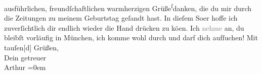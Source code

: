 \begin{ledgroupsized}[t]{13cm}
               ausführlichen, freundſchaftlichen warmherzigen Grüße\substVorne{}\textsuperscript{ſ}\substDazwischen{}d\substHinten{}anken, die du mir durch die Zeitungen zu meinem Geburtstag geſandt hast. In
               dieſem So{\geminationm}er hoffe ich zuverſichtlich dir
               endlich wieder die Hand drücken zu kö{\geminationn}en. Ich
                  \textcolor{gray}{nehme} an, du bleibſt vorläufig in München, {\pb}ich komme wohl durch
               und darf dich aufſuchen!\pend
           \pstart
           Mit tauſen{[}d{]} Grüßen,{\\[\baselineskip]}Dein getreuer{\\[\baselineskip]}\spacefill\mbox{Arthur}\pend
           \leftskip=0em{}
         
         \endnumbering{}\end{ledgroupsized}  \newcommand{\dateiname}{L02385}\newcommand{\titel}{Arthur Schnitzler an Hermann Bahr, 6. 6. 1922}\newcommand{\editorInnen}{ Kurt Ifkovits,  Martin Anton Müller}
      